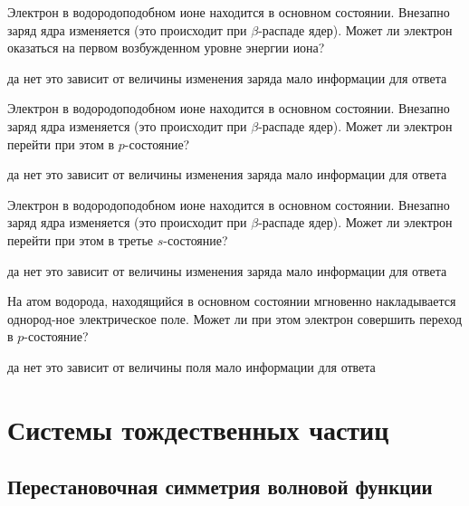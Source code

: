 \documentclass[11pt,a4paper]{exam}
\begin{document}
\begin{questions}
\question Электрон в водородоподобном ионе находится в основном состоянии. Внезапно заряд ядра изменяется (это происходит при $\beta $-распаде ядер). Может ли электрон оказаться на первом возбужденном уровне энергии иона?
\begin{choices}
\choice да
\choice нет
\choice это зависит от величины изменения заряда
\choice мало информации для ответа
\end{choices}

\question Электрон в водородоподобном ионе находится в основном состоянии. Внезапно заряд ядра изменяется (это происходит при $\beta $-распаде ядер). Может ли электрон перейти при этом в $p$-состояние?
\begin{choices}
\choice да
\choice нет
\choice это зависит от величины изменения заряда
\choice мало информации для ответа
\end{choices}

\question Электрон в водородоподобном ионе находится в основном состоянии. Внезапно заряд ядра изменяется (это происходит при $\beta $-распаде ядер). Может ли электрон перейти при этом в третье $s$-состояние?
\begin{choices}
\choice да
\choice нет
\choice это зависит от величины изменения заряда
\choice мало информации для ответа
\end{choices}

\question На атом водорода, находящийся в основном состоянии мгновенно накладывается однород-ное электрическое поле. Может ли при этом электрон совершить переход в $p$-состояние?
\begin{choices}
\choice да
\choice нет
\choice это зависит от величины поля
\choice мало информации для ответа
\end{choices}

\end{questions}


\section{ Системы тождественных частиц }

\subsection{ Перестановочная симметрия волновой функции }
\end{document}
